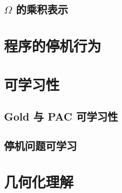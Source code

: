 \documentclass[a4paper,12pt]{article}
\numberwithin{problem}{section}
\numberwithin{definition}{section}
\numberwithin{lemma}{section}
\numberwithin{proposition}{section}
\numberwithin{theorem}{section}
\numberwithin{grammar}{section}
\numberwithin{program}{section}
\numberwithin{convention}{section}
\numberwithin{corollary}{section}
\begin{document}
\subsection{$\Omega$ 的乘积表示}

\newpage

\section{程序的停机行为}

\newpage

\section{可学习性}

\subsection{Gold 与 PAC 可学习性}

\subsection{停机问题可学习}

\newpage

\section{几何化理解}

\newpage
\end{document}
